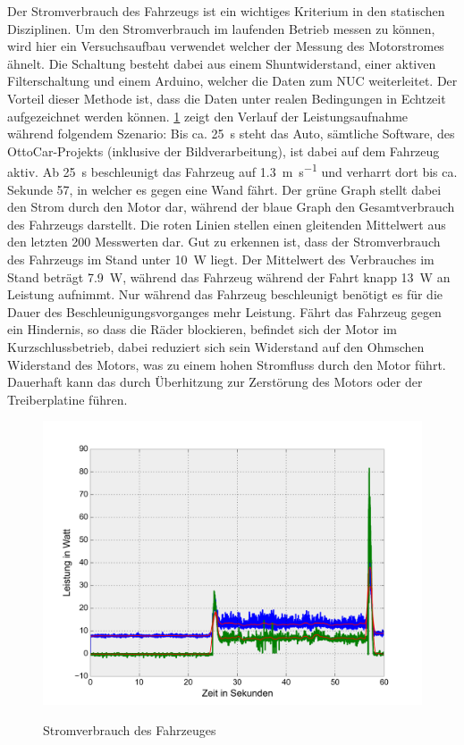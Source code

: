 Der Stromverbrauch des Fahrzeugs ist ein wichtiges Kriterium in den statischen Disziplinen. Um den Stromverbrauch im laufenden Betrieb messen zu können, wird hier ein Versuchsaufbau verwendet welcher der Messung des
Motorstromes ähnelt. Die Schaltung besteht dabei aus einem Shuntwiderstand, einer aktiven Filterschaltung und einem Arduino, welcher die Daten zum NUC weiterleitet. Der Vorteil dieser Methode ist, dass die Daten
unter realen Bedingungen in Echtzeit aufgezeichnet werden können. \cref{fig:power_consumption} zeigt den Verlauf der Leistungsaufnahme während folgendem Szenario: Bis ca. \SI{25}{\second} steht das Auto, sämtliche Software, des OttoCar-Projekts (inklusive
der Bildverarbeitung), ist dabei auf 
dem Fahrzeug aktiv. Ab \SI{25}{\second} beschleunigt das Fahrzeug auf \SI{1,3}{\metre\per\second} und verharrt dort bis ca. Sekunde 57, in welcher es gegen eine Wand fährt. Der grüne Graph stellt dabei den Strom durch den Motor dar, während
der blaue Graph den Gesamtverbrauch des Fahrzeugs darstellt. Die roten Linien stellen einen gleitenden Mittelwert aus den letzten 200 Messwerten dar. Gut zu erkennen ist, dass der Stromverbrauch des Fahrzeugs im Stand unter 
\SI{10}{\watt} liegt. Der Mittelwert des Verbrauches im Stand beträgt \SI{7,9}{\watt}, während das Fahrzeug während der Fahrt knapp \SI{13}{\watt} an Leistung aufnimmt. Nur während das Fahrzeug beschleunigt benötigt es für die Dauer
des Beschleunigungsvorganges mehr Leistung. Fährt das Fahrzeug gegen ein Hindernis, so dass die Räder blockieren, befindet sich der Motor im Kurzschlussbetrieb, dabei reduziert sich sein Widerstand auf den Ohmschen Widerstand
des Motors, was zu einem hohen Stromfluss durch den Motor führt. Dauerhaft kann das durch Überhitzung zur Zerstörung des Motors oder der Treiberplatine führen.

\begin{figure}[H]
\centering
\includegraphics[width=.8\textwidth]{Strom/Power.png}\\
\caption{Stromverbrauch des Fahrzeuges}%
\label{fig:power_consumption}
\end{figure}

